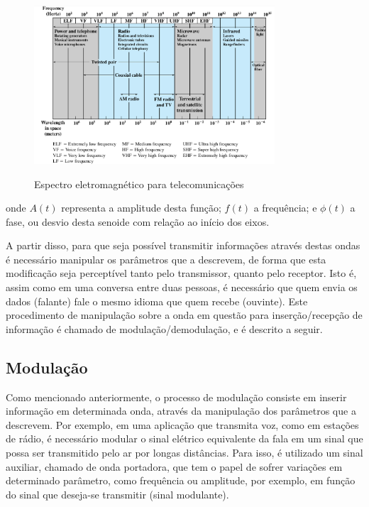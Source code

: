 \documentclass[oneside,openright,12pt]{ufsm_2015} %
\begin{document}
\begin{figure}[ht]
     \caption{\label{exepretex} Espectro eletromagnético para telecomunicações}
\centering
\includegraphics[width=0.8\textwidth]{figuras/espectro.png}
\vspace{\baselineskip} %
    \label{fig:espectro}
\end{figure}


onde $A(t)$ representa a amplitude desta função; $f(t)$ a frequência; e $\phi (t)$ a fase, ou desvio desta senoide com relação ao início dos eixos.

A partir disso, para que seja possível transmitir informações através destas ondas é necessário manipular os parâmetros que a descrevem, de forma que esta modificação seja perceptível tanto pelo transmissor, quanto pelo receptor. Isto é, assim como em uma conversa entre duas pessoas, é necessário que quem envia os dados (falante) fale o mesmo idioma que quem recebe (ouvinte). Este procedimento de manipulação sobre a onda em questão para inserção/recepção de informação é chamado de modulação/demodulação, e é descrito a seguir.

\subsection{Modulação}
Como mencionado anteriormente, o processo de modulação consiste em inserir informação em determinada onda, através da manipulação dos parâmetros que a descrevem. Por exemplo, em uma aplicação que transmita voz, como em estações de rádio, é necessário modular o sinal elétrico equivalente da fala em um sinal que possa ser transmitido pelo ar por longas distâncias. Para isso, é utilizado um sinal auxiliar, chamado de onda portadora, que tem o papel de sofrer variações em determinado parâmetro, como frequência ou amplitude, por exemplo, em função do sinal que deseja-se transmitir (sinal modulante). 
\end{document}
